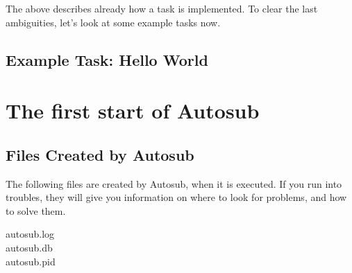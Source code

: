 The above describes already how a task is implemented. To clear the last ambiguities, let's
look at some example tasks now.

\subsection{Example Task: Hello World}

\cleardoublepage
\section{The first start of Autosub}



\subsection{Files Created by Autosub}

The following files are created by Autosub, when it is executed. If you run into troubles,
they will give you information on where to look for problems, and how to solve them.

\begin{description}
\item [autosub.log]
\item [autosub.db]
\item [autosub.pid]

\end{description}
